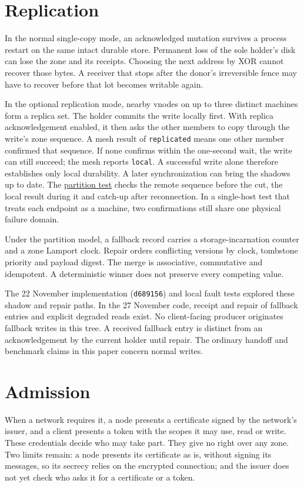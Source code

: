 \documentclass[11pt]{article}
\begin{document}
\section{Replication}\hypertarget{ix:replication}{}
In the normal single-copy mode, an acknowledged mutation survives a process restart on the same intact durable store. Permanent loss of the sole holder's disk can lose the zone and its receipts. Choosing the next address by XOR cannot recover those bytes. A receiver that stops after the donor's irreversible fence may have to recover before that lot becomes writable again.

In the optional replication mode, nearby vnodes on up to three distinct machines form a replica set. The holder commits the write locally first. With replica acknowledgement enabled, it then asks the other members to copy through the write's zone sequence. A mesh result of \texttt{replicated} means one other member confirmed that sequence. If none confirms within the one-second wait, the write can still succeed; the mesh reports \texttt{local}. A successful write alone therefore establishes only local durability. A later synchronization can bring the shadows up to date. The \href{https://github.com/indexus/core/blob/5188b61/internal/mesh/replicate_test.go}{partition test} checks the remote sequence before the cut, the local result during it and catch-up after reconnection. In a single-host test that treats each endpoint as a machine, two confirmations still share one physical failure domain.

Under the partition model, a fallback record carries a storage-incarnation counter and a zone Lamport clock. Repair orders conflicting versions by clock, tombstone priority and payload digest. The merge is associative, commutative and idempotent. A deterministic winner does not preserve every competing value.

The 22 November implementation (\texttt{d689156}) and local fault tests explored these shadow and repair paths. In the 27 November code, receipt and repair of fallback entries and explicit degraded reads exist. No client-facing producer originates fallback writes in this tree. A received fallback entry is distinct from an acknowledgement by the current holder until repair. The ordinary handoff and benchmark claims in this paper concern normal writes.

\section{Admission}
When a network requires it, a node presents a certificate signed by the network's issuer, and a client presents a token with the scopes it may use, read or write. These credentials decide who may take part. They give no right over any zone. Two limits remain: a node presents its certificate as is, without signing its messages, so its secrecy relies on the encrypted connection; and the issuer does not yet check who asks it for a certificate or a token.
\end{document}
